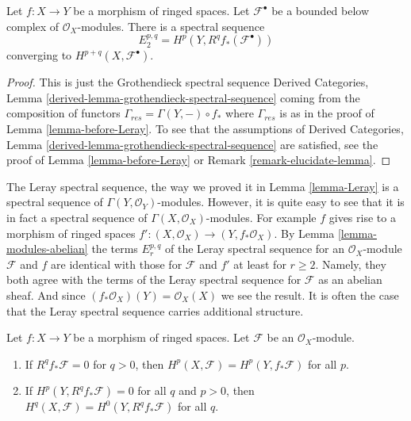 \begin{lemma}
\label{lemma-Leray}
Let $f : X \to Y$ be a morphism of ringed spaces.
Let $\mathcal{F}^\bullet$ be
a bounded below complex of $\mathcal{O}_X$-modules.
There is a spectral sequence
$$
E_2^{p, q} = H^p(Y, R^qf_*(\mathcal{F}^\bullet))
$$
converging to $H^{p + q}(X, \mathcal{F}^\bullet)$.
\end{lemma}

\begin{proof}
This is just the Grothendieck spectral sequence
Derived Categories, Lemma \ref{derived-lemma-grothendieck-spectral-sequence}
coming from the composition of functors
$\Gamma_{res} = \Gamma(Y, -) \circ f_*$ where $\Gamma_{res}$ is as
in the proof of Lemma \ref{lemma-before-Leray}.
To see that the assumptions of
Derived Categories, Lemma \ref{derived-lemma-grothendieck-spectral-sequence}
are satisfied, see the proof of Lemma \ref{lemma-before-Leray} or
Remark \ref{remark-elucidate-lemma}.
\end{proof}

\begin{remark}
\label{remark-Leray-ss-more-structure}
The Leray spectral sequence, the way we proved it in Lemma \ref{lemma-Leray}
is a spectral sequence of $\Gamma(Y, \mathcal{O}_Y)$-modules. However, it
is quite easy to see that it is in fact a spectral sequence of
$\Gamma(X, \mathcal{O}_X)$-modules. For example $f$ gives rise to
a morphism of ringed spaces
$f' :  (X, \mathcal{O}_X) \to (Y, f_*\mathcal{O}_X)$.
By Lemma \ref{lemma-modules-abelian} the terms $E_r^{p, q}$ of the
Leray spectral sequence for an $\mathcal{O}_X$-module $\mathcal{F}$
and $f$ are identical with those for $\mathcal{F}$ and $f'$
at least for $r \geq 2$. Namely, they both agree with the terms of the Leray
spectral sequence for $\mathcal{F}$ as an abelian sheaf.
And since $(f_*\mathcal{O}_X)(Y) = \mathcal{O}_X(X)$ we see the result.
It is often the case
that the Leray spectral sequence carries additional structure.
\end{remark}

\begin{lemma}
\label{lemma-apply-Leray}
Let $f : X \to Y$ be a morphism of ringed spaces.
Let $\mathcal{F}$ be an $\mathcal{O}_X$-module.
\begin{enumerate}
\item If $R^qf_*\mathcal{F} = 0$ for $q > 0$, then
$H^p(X, \mathcal{F}) = H^p(Y, f_*\mathcal{F})$ for all $p$.
\item If $H^p(Y, R^qf_*\mathcal{F}) = 0$ for all $q$ and $p > 0$, then
$H^q(X, \mathcal{F}) = H^0(Y, R^qf_*\mathcal{F})$ for all $q$.
\end{enumerate}
\end{lemma}

